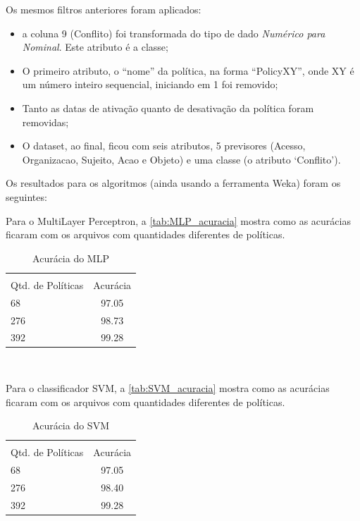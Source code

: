 Os mesmos filtros anteriores foram aplicados:\begin{itemize} \label{filtros}
	\item a coluna 9 (Conflito) foi transformada do tipo de dado \textit{Numérico para Nominal}. Este atributo é a classe;
	\item O primeiro atributo, o ``nome'' da política, na forma ``PolicyXY'', onde XY é um número inteiro sequencial, iniciando em 1 foi removido;
	\item Tanto as datas de ativação quanto de desativação da política foram removidas;
	\item O dataset, ao final, ficou com seis atributos, 5 previsores (Acesso, Organizacao, Sujeito, Acao e Objeto) e uma classe (o atributo `Conflito').
\end{itemize}

Os resultados para os algoritmos (ainda usando a ferramenta Weka) foram os seguintes:

Para o MultiLayer Perceptron, a \autoref{tab:MLP_acuracia} mostra como as acurácias ficaram com os arquivos com quantidades diferentes de políticas.

\begin{table}[h!]
	\centering
	\caption{Acurácia do MLP}
	\label{tab:MLP_acuracia}
	\vspace{0.3cm}
	\begin{tabular}{p{6cm}c}
		\hline\\
		Qtd. de Políticas	& Acurácia  \\[10pt] 
		\hline
		68 					& 97.05    	\\
		276			     	& 98.73     \\
		392					& 99.28		\\
		\hline
	\end{tabular}
	\\[6pt]		
\end{table}

Para o classificador SVM, a \autoref{tab:SVM_acuracia} mostra como as acurácias ficaram com os arquivos com quantidades diferentes de políticas.

\begin{table}[h!]
	\centering
	\caption{Acurácia do SVM}
	\label{tab:SVM_acuracia}
	\vspace{0.3cm}
	\begin{tabular}{p{6cm}c}
		\hline\\
		Qtd. de Políticas	& Acurácia  \\[10pt] 
		\hline
		68 					& 97.05    	\\
		276		     	& 98.40     \\
		392					& 99.28		\\
		\hline
	\end{tabular}
	\\[6pt]		
\end{table}

